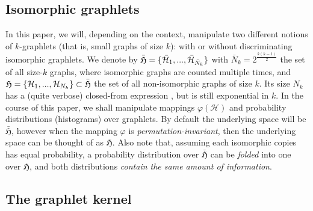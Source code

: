 \documentclass{article}
\begin{document}
\subsection{Isomorphic graphlets}

In this paper, we will, depending on the context, manipulate two different notions of $k$-graphlets (that is, small graphs of size $k$): with or without discriminating isomorphic graphlets. We denote by $\bar{\mathfrak{H}}=\{\bar{\mathcal{H}}_1,..., \bar{\mathcal{H}}_{\bar N_k}\}$ with $\bar{N}_k = 2^{\frac{k(k-1)}{2}}$ the set of all size-$k$ graphs, where isomorphic graphs are counted multiple times, and $\mathfrak{H}=\{\mathcal{H}_1,..., \mathcal{H}_{N_k}\} \subset \bar{\mathfrak{H}}$ the set of all non-isomorphic graphs of size $k$. Its size $N_k$ has a (quite verbose) closed-from expression \cite{oeis}, but is still exponential in $k$.
%
In the course of this paper, we shall manipulate mappings $\varphi(\mathcal{H})$ and probability distributions (histograms) over graphlets. By default the underlying space will be $\bar{\mathfrak{H}}$, however when the mapping $\varphi$ is \emph{permutation-invariant}, then the underlying space can be thought of as $\mathfrak{H}$. %
Also note that, assuming each isomorphic copies has equal probability, a probability distribution over $\bar{\mathfrak{H}}$ can be \emph{folded} into one over $\mathfrak{H}$, and both distributions \emph{contain the same amount of information}.

\subsection{The graphlet kernel}
\end{document}

